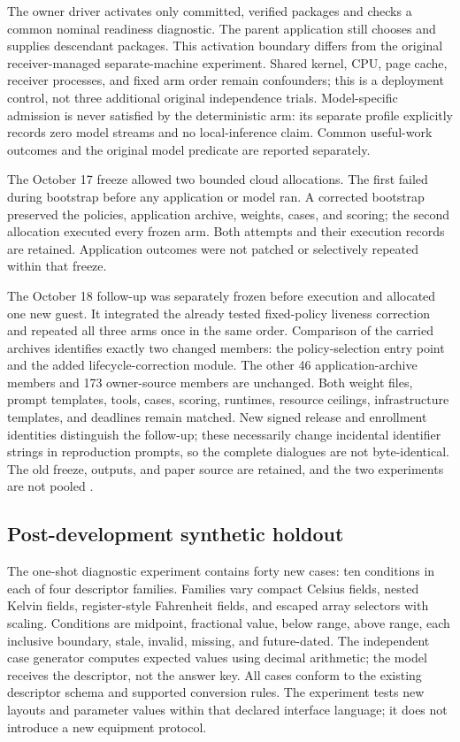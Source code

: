 \documentclass[11pt,letterpaper]{article}
\begin{document}
The owner driver activates only committed, verified packages and checks a
common nominal readiness diagnostic. The parent application still chooses and
supplies descendant packages. This activation boundary differs from the
original receiver-managed separate-machine experiment. Shared kernel, CPU,
page cache, receiver processes, and fixed arm order remain confounders; this is
a deployment control, not three additional original independence trials.
Model-specific admission is never satisfied by the deterministic arm: its
separate profile explicitly records zero model streams and no local-inference
claim. Common useful-work outcomes and the original model predicate are
reported separately.

The October 17 freeze allowed two bounded cloud allocations. The first failed
during bootstrap before any application or model ran. A corrected bootstrap
preserved the policies, application archive, weights, cases, and scoring; the
second allocation executed every frozen arm. Both attempts and their execution
records are retained. Application outcomes were not patched or selectively
repeated within that freeze.

The October 18 follow-up was separately frozen before execution and allocated
one new guest. It integrated the already tested fixed-policy liveness correction
and repeated all three arms once in the same order. Comparison of the carried
archives identifies exactly two changed members: the policy-selection entry
point and the added lifecycle-correction module. The other 46 application-archive
members and 173 owner-source members are unchanged. Both weight files, prompt
templates, tools, cases, scoring, runtimes, resource ceilings, infrastructure
templates, and deadlines remain matched. New signed release and enrollment
identities distinguish the follow-up; these necessarily change incidental
identifier strings in reproduction prompts, so the complete dialogues are not
byte-identical. The old freeze, outputs, and paper source are retained, and the
two experiments are not pooled \cite{correctedcontrols,repropackage}.

\subsection{Post-development synthetic holdout}

The one-shot diagnostic experiment contains forty new cases: ten conditions in
each of four descriptor families. Families vary compact Celsius fields, nested
Kelvin fields, register-style Fahrenheit fields, and escaped array selectors
with scaling. Conditions are midpoint, fractional value, below range, above
range, each inclusive boundary, stale, invalid, missing, and future-dated.
The independent case generator computes expected values using decimal
arithmetic; the model receives the descriptor, not the answer key.
All cases conform to the existing descriptor schema and supported conversion
rules. The experiment tests new layouts and parameter values within that
declared interface language; it does not introduce a new equipment protocol.
\end{document}
